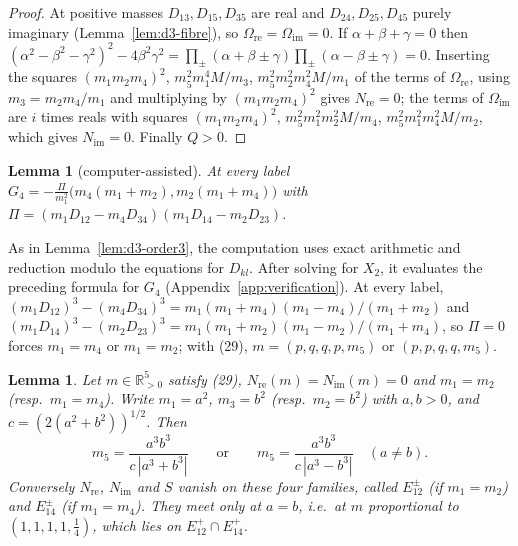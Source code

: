 \documentclass[11pt]{amsart}
\newtheorem{lemma}[theorem]{Lemma}
\theoremstyle{definition}
\theoremstyle{remark}
\newcommand{\Rp}{\mathbb{R}_{>0}}
\begin{document}
\begin{proof}
At positive masses $D_{13},D_{15},D_{35}$ are real and $D_{24},D_{25},D_{45}$ purely imaginary
(Lemma~\ref{lem:d3-fibre}), so $\Omega_{\mathrm{re}}=\Omega_{\mathrm{im}}=0$.  If
$\alpha+\beta+\gamma=0$ then $(\alpha^2-\beta^2-\gamma^2)^2-4\beta^2\gamma^2=\prod_\pm(\alpha+\beta
\pm\gamma)\prod_\pm(\alpha-\beta\pm\gamma)=0$.  Inserting the squares $(m_1m_2m_4)^2$,
$m_5^2m_1^4M/m_3$, $m_5^2m_2^2m_4^2M/m_1$ of the terms of $\Omega_{\mathrm{re}}$, using
$m_3=m_2m_4/m_1$ and multiplying by $(m_1m_2m_4)^2$ gives $N_{\mathrm{re}}=0$; the terms of
$\Omega_{\mathrm{im}}$ are $i$ times reals with squares $(m_1m_2m_4)^2$, $m_5^2m_1^2m_2^2M/m_4$,
$m_5^2m_1^2m_4^2M/m_2$, which gives $N_{\mathrm{im}}=0$.  Finally $Q>0$.
\end{proof}

\begin{lemma}[computer-assisted]\label{lem:d3-order4}
At every label $G_4=-\frac{\Pi}{m_1^2}\bigl(m_4(m_1+m_2),m_2(m_1+m_4)\bigr)$ with
$\Pi=(m_1D_{12}-m_4D_{34})(m_1D_{14}-m_2D_{23})$.
\end{lemma}

{As in Lemma~\ref{lem:d3-order3}, the computation uses exact arithmetic and reduction
modulo the equations for $D_{kl}$. After solving for $X_2$, it evaluates the preceding formula
for $G_4$ (Appendix~\ref{app:verification}). At every label,}
$(m_1D_{12})^3-(m_4D_{34})^3=m_1(m_1+m_4)(m_1-m_4)/(m_1+m_2)$ and
$(m_1D_{14})^3-(m_2D_{23})^3=m_1(m_1+m_2)(m_1-m_2)/(m_1+m_4)$, so $\Pi=0$ forces $m_1=m_4$ or
$m_1=m_2$; with (29), $m=(p,q,q,p,m_5)$ or $(p,p,q,q,m_5)$.

{\begin{lemma}\label{lem:d3-curves}
Let $m\in\Rp^5$ satisfy (29), $N_{\mathrm{re}}(m)=N_{\mathrm{im}}(m)=0$ and $m_1=m_2$ (resp.\
$m_1=m_4$).  Write $m_1=a^2$, $m_3=b^2$ (resp.\ $m_2=b^2$) with $a,b>0$, and
$c=(2(a^2+b^2))^{1/2}$.  Then
\[
m_5=\frac{a^3b^3}{c\,|a^3+b^3|}\qquad\text{or}\qquad m_5=\frac{a^3b^3}{c\,|a^3-b^3|}\quad(a\ne b).
\]
Conversely $N_{\mathrm{re}}$, $N_{\mathrm{im}}$ and $S$ vanish on these four families, called
$E^\pm_{12}$ (if $m_1=m_2$) and $E^\pm_{14}$ (if $m_1=m_4$).  They meet only at $a=b$, i.e.\ at
$m$ proportional to $(1,1,1,1,\frac14)$, which lies on $E^+_{12}\cap E^+_{14}$.
\end{lemma}}
\end{document}
